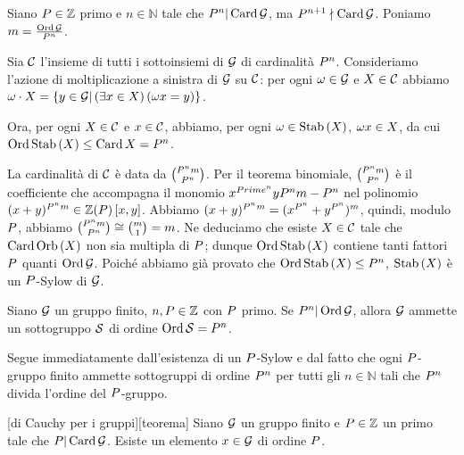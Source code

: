 \Proof
Siano $P \in \mathbb{Z}$ primo e $n \in \mathbb{N}$
tale che $P^n | \operatorname{Card}{\mathcal{G}}$, ma
$P^{n + 1} \nmid \operatorname{Card}{\mathcal{G}}$. Poniamo
$m = \frac{\operatorname{\operatorname{Ord}}{\mathcal{G}}}{P^n}$.
\par
Sia $\mathcal{C}$ l'insieme di tutti i sottoinsiemi di
$\mathcal{G}$ di cardinalit\`a $P^n$.
Consideriamo l'azione di moltiplicazione a sinistra
di $\mathcal{G}$ su $\mathcal{C}$: per ogni $\omega \in \mathcal{G}$
e $X \in \mathcal{C}$ abbiamo $\omega \cdot X =
\lbrace y \in \mathcal{G} | \left ( \exists x \in X \right ) \left ( \omega x = y \right ) \rbrace$.
\par
Ora, per ogni $X \in \mathcal{C}$ e $x \in \mathcal{C}$,
abbiamo, per ogni $\Operator \in \Stabilizer{X}$,
$\omega x \in X$, da cui $\GroupOrder{\Stabilizer{X}} \leq
\Cardinality{X} = \Prime^n$.
\par
La cardinalit\`a di $\mathcal{C}$ \`e data da
$\binom{P^n m}{P^n}$. Per il teorema binomiale,
$\binom{P^n m}{P^n}$ \`e il coefficiente
che accompagna il monomio $x^{Prime^n}y{P^n m -P^n}$ nel polinomio
$(x + y)^{P^n m} \in \mathbb{Z}{\left ( P \right )} \left [ x,y \right ]$.
Abbiamo
$(x + y)^{P^n m} =
(x^{P^n} + y^{P^n})^m$,
quindi, modulo $P$, abbiamo
$\binom{P^n m}{P^n} \cong
\binom{m}{1} = m$.
Ne deduciamo che esiste $X \in \mathcal{C}$ tale che
$\Cardinality{\Orbit{X}}$ non sia multipla di $P$;
dunque $\GroupOrder{\Stabilizer{X}}$ contiene tanti fattori
$P$ quanti $\operatorname{\operatorname{Ord}}{\mathcal{G}}$.
Poich\'e abbiamo gi\`a provato che $\GroupOrder{\Stabilizer{X}} \leq
\Prime^n$, $\Stabilizer{X}$ \`e un $P$-Sylow di $\mathcal{G}$.
\EndProof
\begin{Corollary}
	Siano $\mathcal{G}$ un gruppo finito,
	$n, P \in \mathbb{Z}$ con
	$P$ primo.
	Se $P^n | \operatorname{\operatorname{Ord}}{\mathcal{G}}$, allora
	$\mathcal{G}$ ammette un sottogruppo $\mathcal{S}$
	di ordine $\operatorname{\operatorname{Ord}}{\mathcal{S}} = P^n$.
\end{Corollary}
\Proof
Segue immediatamente dall'esistenza di un $P$-Sylow e
dal fatto che ogni $P$-gruppo finito ammette sottogruppi di ordine
$P^n$ per tutti gli $n \in \mathbb{N}$ tali che $P^n$ divida
l'ordine del $P$-gruppo.
\EndProof
\begin{Corollary}
[di Cauchy per i gruppi][teorema]
	Siano $\mathcal{G}$ un gruppo finito e
	$P \in \mathbb{Z}$ un primo tale che
	$P | \operatorname{Card}{\mathcal{G}}$.
	Esiste un elemento $x \in \mathcal{G}$ di ordine $P$.
\end{Corollary}
